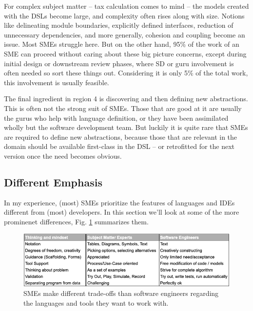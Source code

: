 \documentclass[runningheads]{llncs}
\newcommand{\fig}[1]{Fig. \ref{#1}}  %
\begin{document}
For complex subject matter -- tax calculation comes to mind -- the models
created with the DSLs become large, and complexity often rises along with size.
Notions like delineating module boundaries, explicitly defined interfaces,
reduction of unnecessary dependencies, and more generally, cohesion and coupling
become an issue. Most SMEs struggle here. But on the other hand, 95\% of the
work of an SME can proceed without caring about these big picture concerns,
except during initial design or downstream review phases, where SD or guru
involvement is often needed so sort these things out. Considering it is only
5\% of the total work, this involvement is usually feasible.

The final ingredient in region 4 is discovering and then defining new
abstractions. This is often not the strong suit of SMEs. Those that are good
at it are usually the gurus who help with language definition, or they have been
assimilated wholly but the software development team. But luckily it is quite
rare that SMEs are required to define new abstractions, because those that are
relevant in the domain should be available first-class in the DSL -- or
retrofitted for the next version once the need becomes obvious.
 


\subsection{Different Emphasis}

In my experience, (most) SMEs prioritize the features of languages and IDEs
different from (most) developers. In this section we'll look at some of the
more prominenet differences, \fig{table-prefs} summarizes them.

\begin{figure}[t]
\begin{center}
    \includegraphics[width=1\columnwidth]{figures/table-prefs.png}
    \caption{SMEs make different trade-offs than software engineers 
    regarding the languages and tools they want to work with.}
    \label{table-prefs}
\end{center} 
\end{figure} 
\end{document}
